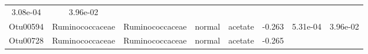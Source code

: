 \documentclass[11pt,]{article}
\begin{document}
\begin{longtable}[]{@{}cccccccc@{}}
\begin{minipage}[t]{0.08\columnwidth}
3.08e-04\strut
\end{minipage} & \begin{minipage}[t]{0.08\columnwidth}\centering\strut
3.96e-02\strut
\end{minipage}\tabularnewline
\begin{minipage}[t]{0.08\columnwidth}\centering\strut
Otu00594\strut
\end{minipage} & \begin{minipage}[t]{0.15\columnwidth}\centering\strut
Ruminococcaceae\strut
\end{minipage} & \begin{minipage}[t]{0.15\columnwidth}\centering\strut
Ruminococcaceae\strut
\end{minipage} & \begin{minipage}[t]{0.08\columnwidth}\centering\strut
normal\strut
\end{minipage} & \begin{minipage}[t]{0.09\columnwidth}\centering\strut
acetate\strut
\end{minipage} & \begin{minipage}[t]{0.07\columnwidth}\centering\strut
-0.263\strut
\end{minipage} & \begin{minipage}[t]{0.08\columnwidth}\centering\strut
5.31e-04\strut
\end{minipage} & \begin{minipage}[t]{0.08\columnwidth}\centering\strut
3.96e-02\strut
\end{minipage}\tabularnewline
\begin{minipage}[t]{0.08\columnwidth}\centering\strut
Otu00728\strut
\end{minipage} & \begin{minipage}[t]{0.15\columnwidth}\centering\strut
Ruminococcaceae\strut
\end{minipage} & \begin{minipage}[t]{0.15\columnwidth}\centering\strut
Ruminococcaceae\strut
\end{minipage} & \begin{minipage}[t]{0.08\columnwidth}\centering\strut
normal\strut
\end{minipage} & \begin{minipage}[t]{0.09\columnwidth}\centering\strut
acetate\strut
\end{minipage} & \begin{minipage}[t]{0.07\columnwidth}\centering\strut
-0.265\strut
\end{minipage} & \begin{minipage}[t]{0.08\columnwidth}\centering\strut

\end{minipage}
\end{longtable}
\end{document}
